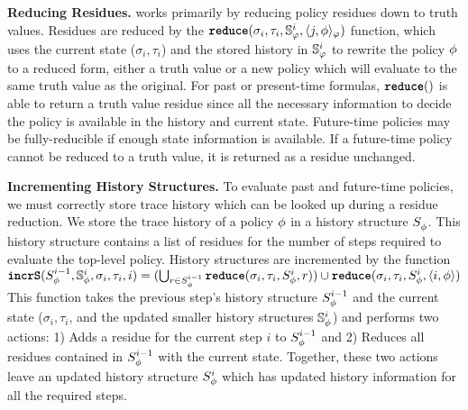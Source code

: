 \textbf{Reducing Residues.}
\monitor works primarily by reducing policy residues down to truth values. Residues are reduced by the $\reduce(\sigma_i, \tau_i, \histSt{i}, \rpt{j}{\policyv}{\policy})$ function, which uses the current state ($\sigma_i,\tau_i$) and the stored history in $\histSt{i}$ to rewrite the policy $\policyv$ to a reduced form, either a truth value or a new policy which will evaluate to the same truth value as the original. For past or present-time formulas, $\reduce()$ is able to return a truth value residue since all the necessary information to decide the policy is available in the history and current state. Future-time policies may be fully-reducible if enough state information is available. If a future-time policy cannot be reduced to a truth value, it is returned as a residue unchanged.

\textbf{Incrementing History Structures.}
To evaluate past and future-time policies, we must correctly store trace history which can be looked up during a residue reduction. 
We store the trace history of a policy $\policyv$ in a history structure $\histst[\policyv]{}$. 
This history structure contains a list of residues for the number of steps required to evaluate the top-level policy. History structures are incremented by the function 
$\incrS(\histst[\policyv]{i-1}, \histSt[\policyv]{i}, \sigma_i, \tau_i, i) = (\bigcup_{r \in \histst[\policyv]{i-1}} \reduce(\sigma_i, \tau_i, \histst[\policyv]{i}, r)) \cup \reduce(\sigma_i, \tau_i, \histst[\policyv]{i}, \rp{i}{\policyv})$
%
This function takes the previous step's history structure $\histst[\policyv]{i-1}$ and the current state ($\sigma_i,\tau_i$, and the updated smaller history structures $\histSt[\policyv]{i}$) and performs two actions:
	1) Adds a residue for the current step $i$ to $\histst[\policyv]{i-1}$ and
	2) Reduces all residues contained in $\histst[\policyv]{i-1}$ with the current state.
Together, these two actions leave an updated history structure $\histst[\policyv]{i}$ which has updated history information for all the required steps.

